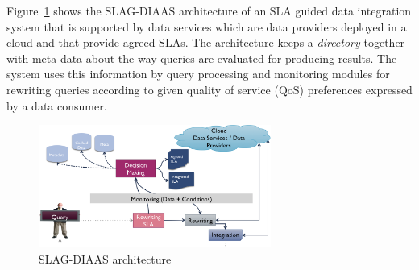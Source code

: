 \documentclass[10pt, conference, compsocconf]{IEEEtran}
\begin{document}
%
Figure~\ref{fig_sim} shows the SLAG-DIAAS architecture of an SLA guided data integration system that is supported by data services which are data providers deployed in a cloud and that provide agreed SLAs. 
The architecture keeps a \textit{directory} together with meta-data about the way queries are evaluated for producing results.
The system uses this information by query processing and monitoring modules for rewriting queries according to given quality of service (QoS) preferences expressed by a data consumer.
\begin{figure}[!t]
\centering
\includegraphics[width=3in]{figs/arch}
\caption{SLAG-DIAAS architecture}
\label{fig_sim}
\end{figure}
\end{document}
